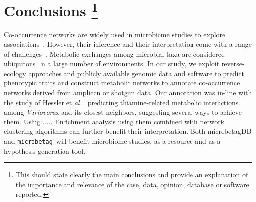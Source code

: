 \documentclass[sn-mathphys,Numbered]{sn-jnl}  %
\theoremstyle{thmstyleone}%
\theoremstyle{thmstyletwo}%
\theoremstyle{thmstylethree}%
\newcommand{\microbetag}{\texttt{microbetag}}
\begin{document}








\section*{Conclusions
\footnote{
    This should state clearly the main conclusions and provide an explanation of the importance and relevance of the case, data, opinion, database or software reported.
}
}
\label{sec:conclusions}


    Co-occurrence networks are widely used in microbiome studies to explore associations~\cite{rottjers2018hairballs}. 
    However, their inference and their interpretation come with a range of challenges~\cite{faust2021open}.
    Metabolic exchanges among microbial taxa are considered ubiquitous~\cite{kost2023metabolic} n a large number of environments. 
    In our study, we exploit reverse-ecology approaches and publicly available genomic data and software to predict phenotypic traits and construct metabolic networks to annotate co-occurrence networks derived from amplicon or shotgun data.
    Our annotation was in-line with the study of Hessler et \textit{al.}~\cite{hessler2023vitamin} predicting thiamine-related metabolic interactions among \textit{Variovorax} and its closest neighbors, suggesting several ways to achieve them. 
    Using ..... 
    Enrichment analysis using them combined with network clustering algorithms can further benefit their interpretation.
    Both microbetagDB and \microbetag~\space will benefit microbiome studies, as a resource and as a hypothesis generation tool.
\end{document}
